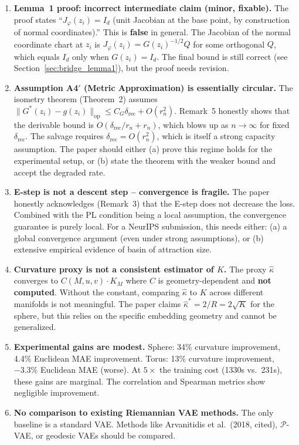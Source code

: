 \documentclass{article}
\begin{document}
\begin{enumerate}[label=(W\arabic*)]
\item \textbf{Lemma~1 proof: incorrect intermediate claim (minor, fixable).}
  The proof states ``$J_\varphi(z_i) = I_d$ (unit Jacobian at the base point,
  by construction of normal coordinates).'' This is \textbf{false} in general.
  The Jacobian of the normal coordinate chart at $z_i$ is
  $J_\varphi(z_i) = G(z_i)^{-1/2} Q$ for some orthogonal $Q$, which equals
  $I_d$ only when $G(z_i) = I_d$. The final bound is still correct (see
  Section~\ref{sec:bridge_lemma1}), but the proof needs revision.

\item \textbf{Assumption A4$'$ (Metric Approximation) is essentially circular.}
  The isometry theorem (Theorem~2) assumes
  $\|G^*(z_i) - g(z_i)\|_{\mathrm{op}} \leq C_G \delta_{\mathrm{rec}} + O(r_n^2)$.
  Remark~5 honestly shows that the derivable bound is
  $O(\delta_{\mathrm{rec}}/r_n + r_n)$, which blows up as $n \to \infty$
  for fixed $\delta_{\mathrm{rec}}$.
  The salvage requires $\delta_{\mathrm{rec}} = O(r_n^2)$, which is itself a
  strong capacity assumption. The paper should either (a) prove this regime
  holds for the experimental setup, or (b) state the theorem with the
  weaker bound and accept the degraded rate.

\item \textbf{E-step is not a descent step -- convergence is fragile.}
  The paper honestly acknowledges (Remark~3) that the E-step does not decrease
  the loss. Combined with the PL condition being a local assumption, the
  convergence guarantee is purely local. For a NeurIPS submission, this
  needs either: (a) a global convergence argument (even under strong
  assumptions), or (b) extensive empirical evidence of basin of attraction size.

\item \textbf{Curvature proxy is not a consistent estimator of $K$.}
  The proxy $\hat{\kappa}$ converges to $C(M, u, v) \cdot K_M$ where
  $C$ is geometry-dependent and \textbf{not computed}. Without the constant,
  comparing $\hat{\kappa}$ to $K$ across different manifolds is not meaningful.
  The paper claims $\hat{\kappa}^* = 2/R = 2\sqrt{K}$ for the sphere, but this
  relies on the specific embedding geometry and cannot be generalized.

\item \textbf{Experimental gains are modest.}
  Sphere: 34\% curvature improvement, 4.4\% Euclidean MAE improvement.
  Torus: 13\% curvature improvement, $-3.3\%$ Euclidean MAE (worse).
  At $5\times$ the training cost (1330s vs.\ 231s), these gains are marginal.
  The correlation and Spearman metrics show negligible improvement.

\item \textbf{No comparison to existing Riemannian VAE methods.}
  The only baseline is a standard VAE. Methods like
  Arvanitidis et al.\ (2018, cited), $\mathcal{P}$-VAE, or geodesic VAEs
  should be compared.
\end{enumerate}
\end{document}
